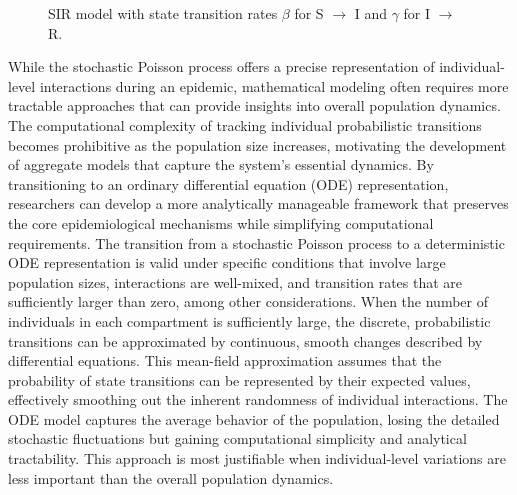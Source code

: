 \begin{figure}[ht]
    \centering
    \caption{SIR model with state transition rates $\beta$ for S $\rightarrow$ I and $\gamma$ for I $\rightarrow$ R.}
    \label{fig:SIR_stochastic_model}
\end{figure}
While the stochastic Poisson process offers a precise representation of individual-level interactions during an epidemic, mathematical modeling often requires more tractable approaches that can provide insights into overall population dynamics. The computational complexity of tracking individual probabilistic transitions becomes prohibitive as the population size increases, motivating the development of aggregate models that capture the system's essential dynamics. By transitioning to an ordinary differential equation (ODE) representation, researchers can develop a more analytically manageable framework that preserves the core epidemiological mechanisms while simplifying computational requirements. %
The transition from a stochastic Poisson process to a deterministic ODE representation is valid under specific conditions that involve large population sizes, interactions are well-mixed, and transition rates that are sufficiently larger than zero, among other considerations.  %
When the number of individuals in each compartment is sufficiently large, the discrete, probabilistic transitions can be approximated by continuous, smooth changes described by differential equations. This mean-field approximation assumes that the probability of state transitions can be represented by their expected values, effectively smoothing out the inherent randomness of individual interactions. The ODE model captures the average behavior of the population, losing the detailed stochastic fluctuations but gaining computational simplicity and analytical tractability. This approach is most justifiable when individual-level variations are less important than the overall population dynamics\cite{armbruster2017elementary}.
